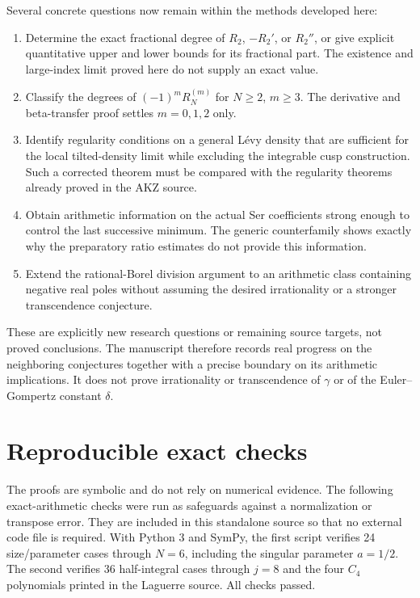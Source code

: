 \documentclass[11pt,a4paper]{article}
\theoremstyle{definition}
\theoremstyle{remark}
\numberwithin{equation}{section}
\renewcommand{\thesection}{\Roman{part}.\arabic{section}}
\renewcommand{\theHsection}{\arabic{part}.main.\arabic{section}}
\newcommand{\PartAppendix}{%
 \setcounter{section}{0}\setcounter{subsection}{0}%
 \renewcommand{\thesection}{\Roman{part}.\Alph{section}}%
 \renewcommand{\theHsection}{\arabic{part}.appendix.\arabic{section}}}
\begin{document}
Several concrete questions now remain within the methods developed here:
\begin{enumerate}
\item Determine the exact fractional degree of $R_2$, $-R_2'$, or
$R_2''$, or give explicit quantitative upper and lower bounds for its
fractional part. The existence and large-index limit proved here do not
supply an exact value.
\item Classify the degrees of $(-1)^mR_N^{(m)}$ for $N\ge2$, $m\ge3$.
The derivative and beta-transfer proof settles $m=0,1,2$ only.
\item Identify regularity conditions on a general L\'evy density that
are sufficient for the local tilted-density limit while excluding the
integrable cusp construction. Such a corrected theorem must be compared
with the regularity theorems already proved in the AKZ source.
\item Obtain arithmetic information on the actual Ser coefficients
strong enough to control the last successive minimum. The generic
counterfamily shows exactly why the preparatory ratio estimates do not
provide this information.
\item Extend the rational-Borel division argument to an arithmetic
class containing negative real poles without assuming the desired
irrationality or a stronger transcendence conjecture.
\end{enumerate}
These are explicitly new research questions or remaining source targets,
not proved conclusions. The manuscript therefore records real progress
on the neighboring conjectures together with a precise boundary on its
arithmetic implications. It does not prove irrationality or transcendence
of $\gamma$ or of the Euler--Gompertz constant $\delta$.

\PartAppendix
\section{Reproducible exact checks}
\label{p8:app:checks}
The proofs are symbolic and do not rely on numerical evidence. The
following exact-arithmetic checks were run as safeguards against a
normalization or transpose error. They are included in this standalone
source so that no external code file is required. With Python 3 and
SymPy, the first script verifies 24 size/parameter cases through $N=6$,
including the singular parameter $a=1/2$. The second verifies 36
half-integral cases through $j=8$ and the four $C_4$ polynomials printed
in the Laguerre source. All checks passed.
\end{document}
